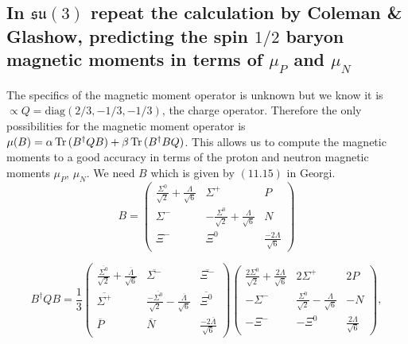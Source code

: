 \documentclass[main.tex]{subfiles}
\begin{document}
\subsection{In $\mathfrak{su}(3)$ repeat the calculation by Coleman \& Glashow, predicting the spin $1/2$ baryon magnetic moments in terms of $\mu_P$ and $\mu_N$}

The specifics of the magnetic moment operator is unknown but we know it is $\propto Q=\text{diag}(2/3,-1/3,-1/3)$, the charge operator. Therefore the only possibilities for the magnetic moment operator is $\mu(B)=\alpha\operatorname{Tr}{(B^{\dagger}QB)}+\beta\operatorname{Tr}{(B^{\dagger}BQ)}$. This allows us to compute the magnetic moments to a good accuracy in terms of the proton and neutron magnetic moments $\mu_P$, $\mu_N$. We need $B$ which is given by $(11.15)$ in Georgi.
\begin{equation}
B=\begin{pmatrix} \frac{\Sigma^0}{\sqrt{2}}+\frac{\Lambda}{\sqrt{6}}&\Sigma^+ &P\\ \Sigma^- & -\frac{\Sigma^0}{\sqrt{2}}+\frac{\Lambda}{\sqrt{6}}&N\\ \Xi^- & \Xi^0& \frac{-2\Lambda}{\sqrt{6}}\end{pmatrix}
\end{equation}

\begin{equation}
B^{\dagger}QB=\frac{1}{3}\begin{pmatrix} \frac{\overline{\Sigma^0}}{\sqrt{2}}+\frac{\overline{\Lambda}}{\sqrt{6}}&\overline{\Sigma^-} &\overline{\Xi^-}\\ \overline{\Sigma^+} & \frac{-\overline{\Sigma^0}}{\sqrt{2}}-\frac{\overline{\Lambda}}{\sqrt{6}}&\overline{\Xi^0}\\ \overline{P} & \overline{N}& \frac{-2\overline{\Lambda}}{\sqrt{6}}\end{pmatrix}\begin{pmatrix}
\frac{2\Sigma^0}{\sqrt{2}}+\frac{2\Lambda}{\sqrt{6}}&2\Sigma^+ &2P\\ -\Sigma^- & \frac{\Sigma^0}{\sqrt{2}}-\frac{\Lambda}{\sqrt{6}}&-N\\ -\Xi^- & -\Xi^0& \frac{2\Lambda}{\sqrt{6}}
\end{pmatrix},
\end{equation}
\end{document}
